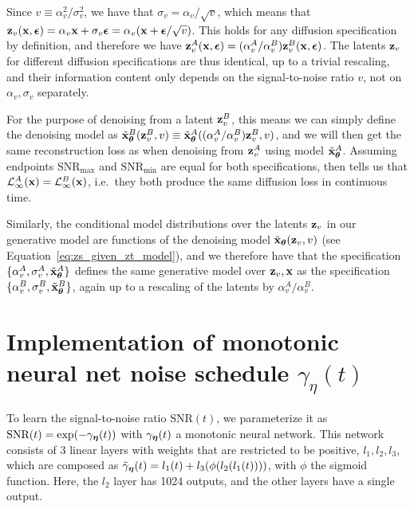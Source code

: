 \documentclass{article}
\newcommand{\snr}{\text{SNR}}
\newcommand{\snrmin}{\text{SNR}_{\text{min}}}
\newcommand{\snrmax}{\text{SNR}_{\text{max}}}
\begin{document}
Since $v \equiv \alpha_v^2/\sigma_v^2$, we have that $\sigma_v = \alpha_v/\sqrt{v}$, which means that ${\mathbf{z}}_v({\mathbf{x}}, {\boldsymbol{\epsilon}}) = \alpha_v {\mathbf{x}} + \sigma_v {\boldsymbol{\epsilon}} = \alpha_v( {\mathbf{x}} + {\boldsymbol{\epsilon}}/\sqrt{v})$. This holds for any diffusion specification by definition, and therefore we have ${\mathbf{z}}^A_v({\mathbf{x}}, {\boldsymbol{\epsilon}}) = (\alpha^A_v/\alpha^B_v) {\mathbf{z}}_v^B({\mathbf{x}}, {\boldsymbol{\epsilon}})$. The latents ${\mathbf{z}}_v$ for different diffusion specifications are thus identical, up to a trivial rescaling, and their information content only depends on the signal-to-noise ratio $v$, not on $\alpha_v,\sigma_v$ separately.

For the purpose of denoising from a latent ${\mathbf{z}}^{B}_{v}$, this means we can simply define the denoising model as $\tilde{{\mathbf{x}}}^B_{{\boldsymbol{\theta}}}({\mathbf{z}}^{B}_{v}, v) \equiv \tilde{{\mathbf{x}}}^A_{{\boldsymbol{\theta}}}((\alpha^A_v/\alpha^B_v){\mathbf{z}}^{B}_{v}, v)$, and we will then get the same reconstruction loss as when denoising from ${\mathbf{z}}^{A}_{v}$ using model $\tilde{{\mathbf{x}}}^A_{{\boldsymbol{\theta}}}$. Assuming endpoints $\snrmax$ and $\snrmin$ are equal for both specifications,  then tells us that $\mathcal{L}^A_{\infty}({\mathbf{x}}) = \mathcal{L}^B_{\infty}({\mathbf{x}})$, i.e.\ they both produce the same diffusion loss in continuous time.

Similarly, the conditional model distributions over the latents ${\mathbf{z}}_{v}$ in our generative model are functions of the denoising model $\tilde{{\mathbf{x}}}_{{\boldsymbol{\theta}}}({\mathbf{z}}_{v}, v)$ (see Equation~\ref{eq:zs_given_zt_model}), and we therefore have that the specification $\{\alpha^A_v, \sigma^A_v, \tilde{{\mathbf{x}}}^A_{{\boldsymbol{\theta}}}\}$ defines the same generative model over ${\mathbf{z}}_{v}, {\mathbf{x}}$ as the specification $\{\alpha^B_v, \sigma^B_v, \tilde{{\mathbf{x}}}^B_{{\boldsymbol{\theta}}}\}$, again up to a rescaling of the latents by $\alpha^A_v/\alpha^B_v$.

\section{Implementation of monotonic neural net noise schedule $\gamma_{\eta}(t)$}
\label{app:monotonicnn}

To learn the signal-to-noise ratio $\snr(t)$, we parameterize it as $\snr(t) = \exp(-\gamma_{\boldeta}(t))$ with $\gamma_{{\boldsymbol{\eta}}}(t)$ a monotonic neural network. This network consists of 3 linear layers with weights that are restricted to be positive, $l_{1},l_{2},l_{3}$, which are composed as $\tilde{\gamma}_{{\boldsymbol{\eta}}}(t) = l_{1}(t)+l_{3}(\phi(l_{2}(l_{1}(t))))$, with $\phi$ the sigmoid function. Here, the $l_2$ layer has 1024 outputs, and the other layers have a single output.
\end{document}
